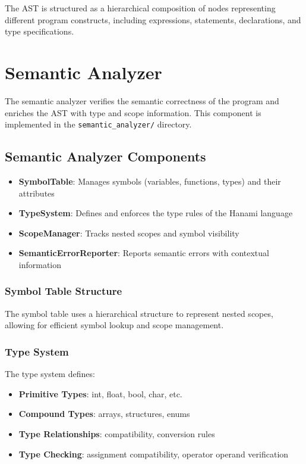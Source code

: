 \documentclass[12pt,a4paper]{article}
\begin{document}
The AST is structured as a hierarchical composition of nodes representing different program constructs, including expressions, statements, declarations, and type specifications.

\section{Semantic Analyzer}

The semantic analyzer verifies the semantic correctness of the program and enriches the AST with type and scope information. This component is implemented in the \texttt{semantic\_analyzer/} directory.

\subsection{Semantic Analyzer Components}

\begin{itemize}
    \item \textbf{SymbolTable}: Manages symbols (variables, functions, types) and their attributes
    \item \textbf{TypeSystem}: Defines and enforces the type rules of the Hanami language
    \item \textbf{ScopeManager}: Tracks nested scopes and symbol visibility
    \item \textbf{SemanticErrorReporter}: Reports semantic errors with contextual information
\end{itemize}

\subsubsection{Symbol Table Structure}

The symbol table uses a hierarchical structure to represent nested scopes, allowing for efficient symbol lookup and scope management.

\subsubsection{Type System}

The type system defines:

\begin{itemize}
    \item \textbf{Primitive Types}: int, float, bool, char, etc.
    \item \textbf{Compound Types}: arrays, structures, enums
    \item \textbf{Type Relationships}: compatibility, conversion rules
    \item \textbf{Type Checking}: assignment compatibility, operator operand verification
\end{itemize}
\end{document}
